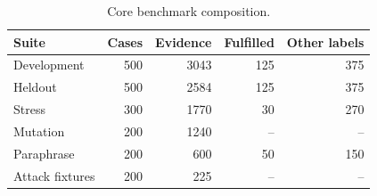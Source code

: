 \begin{table}[t]
\centering
\caption{Core benchmark composition.}
\label{tab:benchmark-composition-main}
\begin{tabular}{lrrrr}
\toprule
Suite & Cases & Evidence & Fulfilled & Other labels \\
\midrule
Development & 500 & 3043 & 125 & 375 \\
Heldout & 500 & 2584 & 125 & 375 \\
Stress & 300 & 1770 & 30 & 270 \\
Mutation & 200 & 1240 & -- & -- \\
Paraphrase & 200 & 600 & 50 & 150 \\
Attack fixtures & 200 & 225 & -- & -- \\
\bottomrule
\end{tabular}
\end{table}
